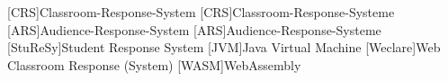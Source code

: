 \begin{acronym}[StuReSy]
    [CRS]{Classroom-Response-System}
    [CRS]{Classroom-Response-Systeme}
    [ARS]{Audience-Response-System}
    [ARS]{Audience-Response-Systeme}
    [StuReSy]{Student Response System}
    [JVM]{Java Virtual Machine}
    [Weclare]{Web Classroom Response (System)}
    [WASM]{WebAssembly}
\end{acronym}
